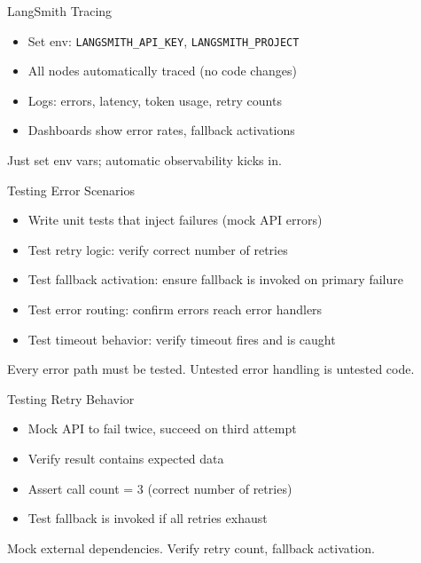 \documentclass[aspectratio=169,11pt]{beamer}
\begin{document}
\begin{frame}{LangSmith Tracing}
\setlength{\itemsep}{1pt}
\begin{itemize}
\item Set env: \texttt{LANGSMITH\_API\_KEY}, \texttt{LANGSMITH\_PROJECT}
\item All nodes automatically traced (no code changes)
\item Logs: errors, latency, token usage, retry counts
\item Dashboards show error rates, fallback activations
\end{itemize}
\vspace{0.1cm}
\begin{tipbox}
Just set env vars; automatic observability kicks in.
\end{tipbox}
\end{frame}

\begin{frame}{Testing Error Scenarios}
\setlength{\itemsep}{1pt}
\begin{itemize}
\item Write unit tests that inject failures (mock API errors)
\item Test retry logic: verify correct number of retries
\item Test fallback activation: ensure fallback is invoked on primary failure
\item Test error routing: confirm errors reach error handlers
\item Test timeout behavior: verify timeout fires and is caught
\end{itemize}
\vspace{0.15cm}
\begin{tipbox}
Every error path must be tested. Untested error handling is untested code.
\end{tipbox}
\end{frame}

\begin{frame}{Testing Retry Behavior}
\setlength{\itemsep}{1pt}
\begin{itemize}
\item Mock API to fail twice, succeed on third attempt
\item Verify result contains expected data
\item Assert call count = 3 (correct number of retries)
\item Test fallback is invoked if all retries exhaust
\end{itemize}
\vspace{0.1cm}
\begin{tipbox}
Mock external dependencies. Verify retry count, fallback activation.
\end{tipbox}
\end{frame}
\end{document}
